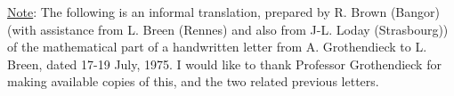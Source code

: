 \uline{Note}: The following is an informal translation, prepared by R. Brown
(Bangor) (with assistance from L. Breen (Rennes) and also from J-L. Loday
(Strasbourg)) of the mathematical part of a handwritten letter from
A. Grothendieck to L. Breen, dated 17-19 July, 1975. I would like to
thank Professor Grothendieck for making available copies of this, and
the two related previous letters.

